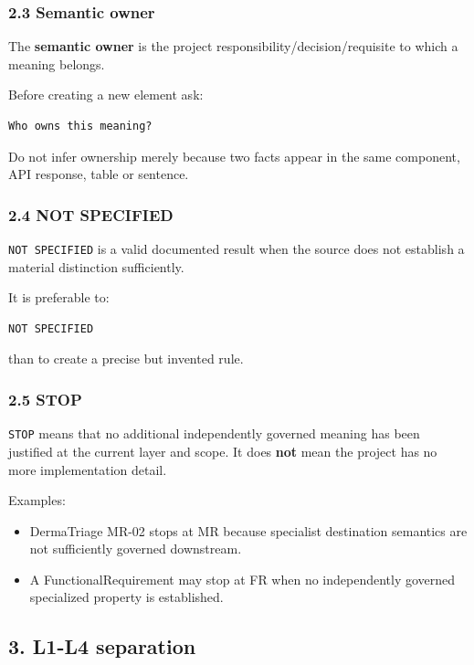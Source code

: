 \documentclass[11pt,a4paper]{article}
\providecommand{\tightlist}{\setlength{\itemsep}{0pt}\setlength{\parskip}{0pt}}
\begin{document}
\subsubsection{2.3 Semantic owner}\label{23-semantic-owner}

The \textbf{semantic owner} is the project
responsibility/decision/requisite to which a meaning belongs.

Before creating a new element ask:

\begin{verbatim}
Who owns this meaning?
\end{verbatim}

Do not infer ownership merely because two facts appear in the same
component, API response, table or sentence.

\subsubsection{2.4 NOT SPECIFIED}\label{24-not-specified}

\texttt{NOT\ SPECIFIED} is a valid documented result when the source
does not establish a material distinction sufficiently.

It is preferable to:

\begin{verbatim}
NOT SPECIFIED
\end{verbatim}

than to create a precise but invented rule.

\subsubsection{2.5 STOP}\label{25-stop}

\texttt{STOP} means that no additional independently governed meaning
has been justified at the current layer and scope. It does \textbf{not}
mean the project has no more implementation detail.

Examples:

\begin{itemize}
\tightlist
\item
  DermaTriage MR-02 stops at MR because specialist destination semantics
  are not sufficiently governed downstream.
\item
  A FunctionalRequirement may stop at FR when no independently governed
  specialized property is established.
\end{itemize}

\subsection{3. L1-L4 separation}\label{3-l1-l4-separation}
\end{document}
